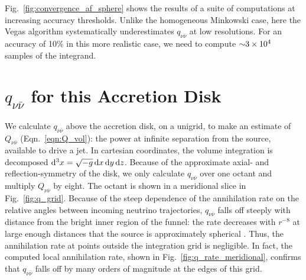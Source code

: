 Fig.~\ref{fig:convergence_af_sphere} shows the results of a suite of
computations at increasing accuracy thresholds.
Unlike the homogeneous Minkowski case, here the Vegas algorithm
systematically underestimates $q_{\nu\bar{\nu}}$ at low resolutions.
For an accuracy of 10\% in this more realistic case, we need to compute
$\mathord{\sim}3\times10^4$ samples of the integrand.

\section{$q_{\nu \bar{\nu}}$ for this Accretion Disk}
\label{sec:q_this_case}
We calculate $q_{\nu\bar{\nu}}$ above the accretion disk, on a unigrid, to make
an estimate of $Q_{\nu\bar{\nu}}$ (Eqn.~\ref{eqn:Q_vol}):
the power at infinite separation from the source, available to drive a jet.
In cartesian coordinates, the volume integration is decomposed
$\mathrm{d}^3 x=\sqrt{-g}\, \mathrm{d} x\,\mathrm{d} y\,\mathrm{d} z$.
Because of the approximate axial- and reflection-symmetry of the disk, we only
calculate $q_{\nu\bar{\nu}}$ over one octant and multiply $Q_{\nu\bar{\nu}}$ by
eight.
The octant is shown in a meridional slice in Fig.~\ref{fig:q_grid}.
Because of the steep dependence of the annihilation rate on the relative angles
between incoming neutrino trajectories, $q_{\nu\bar{\nu}}$ falls off steeply
with distance from the bright inner region of the funnel: the rate decreases with
$r^{-8}$ at large enough distances that the source is approximately spherical
\citep{seti2006-nunubar_and_spin}.
Thus, the annihilation rate at points outside the integration grid is negligible.
In fact, the computed local annihilation rate, shown in
Fig.~\ref{fig:q_rate_meridional},
confirms that $q_{\nu\bar{\nu}}$ falls off by many orders of magnitude at the
edges of this grid.

